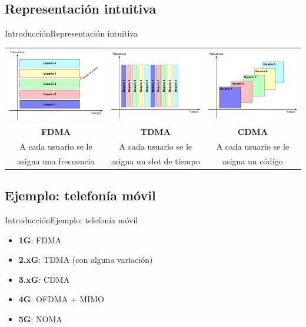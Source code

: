 \documentclass[10pt,compress]{beamer} %
\begin{document}
\subsection{Representación intuitiva}
\begin{frame}{Introducción}{Representación intuitiva}
  \begin{tabular}{ccc}
    \includegraphics[width=0.3\linewidth]{Figuras/FDMA.pdf} & 
    \includegraphics[width=0.3\linewidth]{Figuras/TDMA.pdf} & 
    \includegraphics[width=0.3\linewidth]{Figuras/CDMA.pdf} \\
    {\bf FDMA} & {\bf TDMA} & {\bf CDMA} \\
    A cada usuario se le   & A cada usuario se le & A cada usuario se le \\
    asigna una frecuencia & asigna un slot de tiempo & asigna un código\\
  \end{tabular}

\end{frame}

\subsection{Ejemplo: telefonía móvil}
\begin{frame}{Introducción}{Ejemplo: telefonía móvil}
  \begin{itemize}
    \item {\bf 1G}: FDMA
    \item {\bf 2.xG}: TDMA (con alguna variación)
    \item {\bf 3.xG}: CDMA
    \item {\bf 4G}: OFDMA + MIMO
    \item {\bf 5G}: NOMA
  \end{itemize}
\end{frame}
\end{document}
